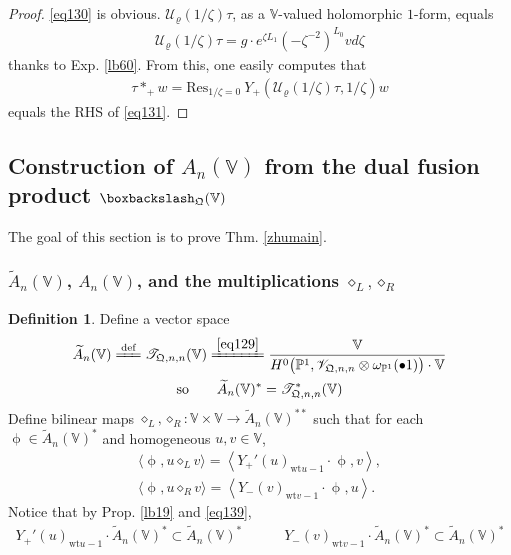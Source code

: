 \documentclass[11pt,b5paper,notitlepage]{article}
\theoremstyle{definition}
\newtheorem{df}{Definition}[subsection]
\theoremstyle{plain}
\newcommand{\mc}{\mathcal}
\newcommand{\wtd}{\widetilde}
\newcommand{\Res}{\mathrm{Res}}
\newcommand{\SV}{\mathscr{V}}
\newcommand{\scr}{\mathscr}
\newcommand{\Vbb}{\mathbb V}
\newcommand{\Pbb}{\mathbb P}
\newcommand{\wt}{\mathrm{wt}}
\newcommand{\<}{\left\langle}
\renewcommand{\>}{\right\rangle}
\newcommand{\ST}{\mathscr{T}}
\newcommand{\bk}[1]{\langle {#1}\rangle}
\newcommand{\bbs}{\boxbackslash}
\newcommand{\fq}{{\mathfrak Q}}
\numberwithin{equation}{subsection}
\begin{document}
\begin{proof}
\eqref{eq130} is obvious.  
$\mc U_\varrho(1/\zeta)\tau$, as a $\Vbb$-valued holomorphic $1$-form, equals 
\begin{align*}
\mc U_\varrho(1/\zeta)\tau=g\cdot e^{\zeta L_1}(-\zeta^{-2})^{L_0}vd\zeta
\end{align*}
thanks to Exp. \ref{lb60}. From this, one easily computes that
\begin{align*}
\tau *_+ w=\Res_{1/\zeta=0}~Y_+(\mc U_\varrho(1/\zeta)\tau,1/\zeta)w
\end{align*}
equals the RHS of \eqref{eq131}.
\end{proof}






\subsection{Construction of $A_n(\Vbb)$ from the dual fusion product $\bbs_\fq(\Vbb)$}


The goal of this section is to prove Thm. \ref{zhumain}.


\subsubsection{$\wtd A_n(\Vbb)$, $A_n(\Vbb)$, and the multiplications $\diamond_L,\diamond_R$}



\begin{df}
Define a vector space \index{AV@$\wtd A_n(\Vbb)$}
\begin{gather}\label{eq134}
\wtd A_n(\Vbb)\xlongequal{\text{def}}\ST_{\fq,n,n}(\Vbb)\xlongequal{\eqref{eq129}}\frac{\Vbb}{H^0\big(\Pbb^1, \SV_{\fq,n,n}\otimes \omega_{\Pbb^1}(\bullet 1)\big)\cdot \Vbb}\\
\text{so}\qquad\wtd A_n(\Vbb)^*=\scr T_{\fq,n,n}^*(\Vbb) \nonumber
\end{gather}
Define bilinear maps $\diamond_L,\diamond_R:\Vbb\times \Vbb\rightarrow \wtd A_n(\Vbb)^{**}$  such that for each $\upphi\in \wtd A_n(\Vbb)^*$ and homogeneous $u,v\in \Vbb$, 
\begin{subequations}\label{zhu6}
\begin{gather}
\bk{\upphi,u\diamond_L v}=\<Y_+'(u)_{\wt u-1}\cdot \upphi,v\>, \label{eq132}\\
\bk{\upphi,u\diamond_R v}=\<Y_-(v)_{\wt v-1}\cdot \upphi,u\>.  \label{eq133}
\end{gather}
\end{subequations}
Notice that by Prop. \ref{lb19} and \eqref{eq139}, 
\begin{align}\label{eq135}
Y_+'(u)_{\wt u-1}\cdot \wtd A_n(\Vbb)^*\subset \wtd A_n(\Vbb)^*\qquad\quad Y_-(v)_{\wt v-1}\cdot \wtd A_n(\Vbb)^*\subset \wtd A_n(\Vbb)^*
\end{align}
\end{df}
\end{document}
